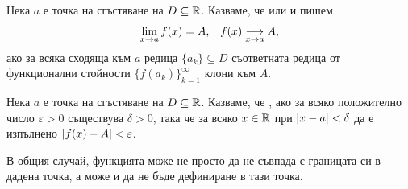 \documentclass[numbers=endperiod, bibliography=totocnumbered]{scrartcl}
\begin{document}
\begin{definition}
  Нека \( a \) е точка на сгъстяване на \( D \subseteq \R \). Казваме, че  или  и пишем
  \begin{align*}
    \lim_{x \to a} f(x) = A,
    &&
    f(x) \Conv[x \to a]{} A,
  \end{align*}
  ако за всяка сходяща към \( a \) редица \( \{ a_k \} \subseteq D \) съответната редица от функционални стойности \( {\{ f(a_k) \}}_{k=1}^\infty \) клони към \( A \).
\end{definition}

\begin{definition}
  Нека \( a \) е точка на сгъстяване на \( D \subseteq \R \). Казваме, че , ако за всяко положително число \( \varepsilon > 0 \) съществува \( \delta > 0 \), така че за всяко \( x \in \R \) при \( \Abs{x - a} < \delta \) да е изпълнено \( \Abs{f(x) - A} < \varepsilon \).
\end{definition}

\begin{note}
  В общия случай, функцията може не просто да не съвпада с границата си в дадена точка, а може и да не бъде дефиниране в тази точка.
\end{note}
\end{document}
